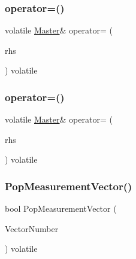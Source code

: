 \subsubsection{\texorpdfstring{operator=()}{operator=()}\hspace{0.1cm}{\footnotesize\ttfamily [1/2]}}
{\footnotesize\ttfamily volatile \mbox{\hyperlink{class_master}{Master}}\& operator= (\begin{DoxyParamCaption}\item[{const \mbox{\hyperlink{class_master}{Master}} \&}]{rhs }\end{DoxyParamCaption}) volatile\hspace{0.3cm}{\ttfamily [inline]}}

\mbox{\label{class_master_a0ce51778d73a67179e58ecc6e136bef9}} 
\subsubsection{\texorpdfstring{operator=()}{operator=()}\hspace{0.1cm}{\footnotesize\ttfamily [2/2]}}
{\footnotesize\ttfamily volatile \mbox{\hyperlink{class_master}{Master}}\& operator= (\begin{DoxyParamCaption}\item[{volatile const \mbox{\hyperlink{class_master}{Master}} \&}]{rhs }\end{DoxyParamCaption}) volatile\hspace{0.3cm}{\ttfamily [inline]}}

\mbox{\label{class_master_ad64bb8e32e356747d0f80fce966a3574}} 
\subsubsection{\texorpdfstring{PopMeasurementVector()}{PopMeasurementVector()}}
{\footnotesize\ttfamily bool Pop\+Measurement\+Vector (\begin{DoxyParamCaption}\item[{\mbox{\hyperlink{_s_p_i___instruction_set_8h_a9d8048399836e11887f85cc8dc3d75d5}{Measurement\+Vectors}}}]{Vector\+Number }\end{DoxyParamCaption}) volatile}




